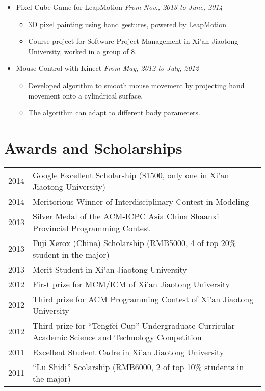 \documentclass[letterpaper,11pt]{article}
\newenvironment{extra}{}{}
\begin{document}
\begin{itemize}
    \item Pixel Cube Game for LeapMotion \hfill \textit{From Nov., 2013 to June, 2014}
    \begin{itemize}
        \item 3D pixel painting using hand gestures, powered by LeapMotion
        \item Course project for Software Project Management in Xi'an Jiaotong University, worked in a group
of 8.
    \end{itemize}

\begin{extra}
    \item Mouse Control with Kinect \hfill \textit{From May, 2012 to July, 2012}
    \begin{itemize}
        \item Developed algorithm to smooth mouse movement by projecting hand movement onto a 
cylindrical surface.
        \item The algorithm can adapt to different body parameters.
    \end{itemize}
\end{extra}

\end{itemize}


\section{Awards and Scholarships}

\begin{tabular}{lp{15cm}}
    2014 & Google Excellent Scholarship (\$1500, only one in Xi'an Jiaotong University) \\
    2014 & Meritorious Winner of Interdisciplinary Contest in Modeling \\
    2013 & Silver Medal of the ACM-ICPC Asia China
            \newline Shaanxi Provincial Programming Contest \\
    2013 & Fuji Xerox (China) Scholarship (RMB5000, 4 of top 20\% student in the major) \\
    2013 & Merit Student in Xi'an Jiaotong University \\
    2012 & First prize for MCM/ICM of Xi'an Jiaotong University \\
    2012 & Third prize for ACM Programming Contest of Xi'an Jiaotong University \\
    2012 & Third prize for ``Tengfei Cup'' Undergraduate
            \newline Curricular Academic Science and Technology Competition \\
    2011 & Excellent Student Cadre in Xi'an Jiaotong University  \\
    2011 & ``Lu Shidi'' Scolarship (RMB6000, 2 of top 10\% students in the major)
\end{tabular}
\end{document}
